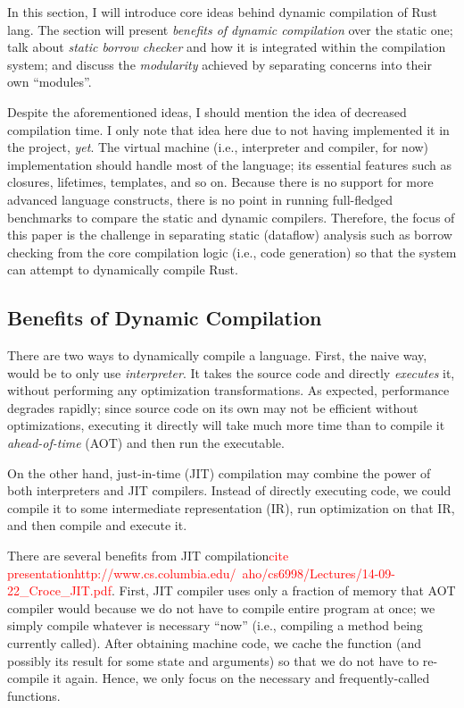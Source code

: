 
In this section, I will introduce core ideas behind dynamic compilation
of Rust lang. The section will present \textit{benefits of 
dynamic compilation} over the static one; talk about 
\textit{static borrow checker} and how it is integrated within the compilation
system; and discuss the \textit{modularity} achieved by separating concerns
into their own ``modules''.

Despite the aforementioned ideas, I should mention the idea of 
decreased compilation time. I only note that idea here due to
not having implemented it in the project, \textit{yet}. The virtual machine 
(i.e., interpreter and compiler, for now) implementation should
handle most of the language; its essential features such as closures,
lifetimes, templates, and so on. Because there is no support for more
advanced language constructs, there is no point in running
full-fledged benchmarks to compare the static and dynamic
compilers. Therefore, the focus of this paper is the challenge in separating
static (dataflow) analysis such as borrow checking from the core compilation
logic (i.e., code generation) so that the system can attempt to 
dynamically compile Rust.

\subsection{Benefits of Dynamic Compilation}

There are two ways to dynamically compile a language.
First, the naive way, would be to only use \textit{interpreter}. It takes
the source code and directly \textit{executes} it, without performing
any optimization transformations. As expected,
performance degrades rapidly; since source code on its own
may not be efficient without optimizations, executing it directly
will take much more time than to compile it \textit{ahead-of-time} (AOT) and
then run the executable.

On the other hand, just-in-time (JIT) compilation may combine the power of 
both interpreters and JIT compilers. Instead of directly executing code,
we could compile it to some intermediate representation (IR), run optimization
on that IR, and then compile and execute it.

There are several benefits from JIT compilation\textcolor{red}{cite presentationhttp://www.cs.columbia.edu/~aho/cs6998/Lectures/14-09-22\_Croce\_JIT.pdf}. First, JIT compiler uses
only a fraction of memory that AOT compiler would because we do not have
to compile entire program at once; we simply compile whatever is necessary 
``now'' (i.e., compiling a method being currently called). After obtaining
machine code, we cache the function (and possibly its result for some
state and arguments) so that we do not have to re-compile it again. Hence,
we only focus on the necessary and frequently-called functions.

